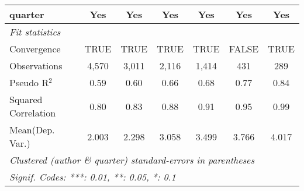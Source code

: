 \begin{tabular}{lcccccc}
   quarter                                                    & Yes           & Yes           & Yes          & Yes           & Yes           & Yes\\  
   \midrule
   \emph{Fit statistics}\\
   Convergence                                                &TRUE           & TRUE          & TRUE         & TRUE          & FALSE         & TRUE\\  
   Observations                                               & 4,570         & 3,011         & 2,116        & 1,414         & 431           & 289\\  
   Pseudo R$^2$                                               & 0.59          & 0.60          & 0.66         & 0.68          & 0.77          & 0.84\\  
   Squared Correlation                                        & 0.80          & 0.83          & 0.88         & 0.91          & 0.95          & 0.99\\  
Mean(Dep. Var.) & 2.003 & 2.298 & 3.058 & 3.499 & 3.766 & 4.017 \\
   \midrule \midrule
   \multicolumn{7}{l}{\emph{Clustered (author \& quarter) standard-errors in parentheses}}\\
   \multicolumn{7}{l}{\emph{Signif. Codes: ***: 0.01, **: 0.05, *: 0.1}}\\
\end{tabular}
\par\endgroup
